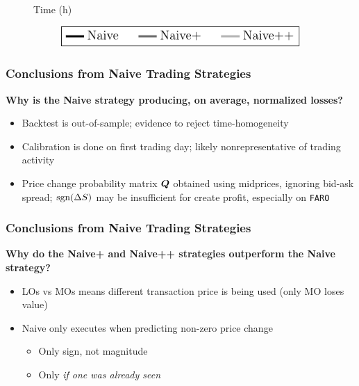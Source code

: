 \begin{frame}
\begin{figure}
Time (h)

\vspace{1cm}%
\begin{subfigure}{\linewidth}%
  \centering%
  \includegraphics[scale=1]{frames/figs/naivestratlegend.pdf}
\end{subfigure}%
\end{figure}

\end{frame}

\begin{frame}
\frametitle{Conclusions from Naive Trading Strategies}
{\bf Why is the Naive strategy producing, on average, normalized losses?}
\begin{itemize}
\item Backtest is out-of-sample; evidence to reject time-homogeneity
\item Calibration is done on first trading day; likely nonrepresentative of trading activity
\item Price change probability matrix $\boldsymbol{Q}$ obtained using midprices, ignoring bid-ask spread; $\operatorname{\mathrm{sgn}}(\Delta S)$ may be insufficient for create profit, especially on \texttt{FARO}
\end{itemize}
\end{frame}

\begin{frame}
\frametitle{Conclusions from Naive Trading Strategies}
{\bf Why do the Naive+ and Naive++ strategies outperform the Naive strategy?}
\begin{itemize}
\item LOs vs MOs means different transaction price is being used (only MO loses value)
\item Naive only executes when predicting non-zero price change
\begin{itemize}
\item Only sign, not magnitude
\item Only \emph{if one was already seen}
\end{itemize}
\end{itemize}
\end{frame}
